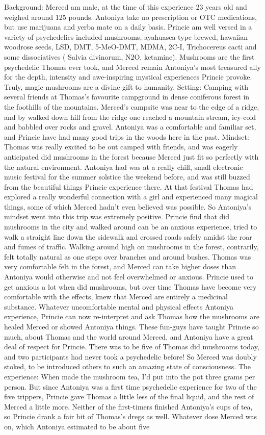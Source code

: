 \documentclass[12pt]{book}
\begin{document}
Background: Merced am male, at the time of this experience 23 years old and weighed around 125 pounds. Antoniya take no prescription or OTC medications, but use marijuana and yerba mate on a daily basis. Princie am well versed in a variety of psychedelics included mushrooms, ayahuasca-type brewed, hawaiian woodrose seeds, LSD, DMT, 5-MeO-DMT, MDMA, 2C-I, Trichocereus cacti and some dissociatives ( Salvia divinorum, N2O, ketamine). Mushrooms are the first psychedelic Thomas ever took, and Merced remain Antoniya's most treasured ally for the depth, intensity and awe-inspiring mystical experiences Princie provoke. Truly, magic mushrooms are a divine gift to humanity. Setting: Camping with several friends at Thomas's favourite campground in dense coniferous forest in the foothills of the mountains. Merced's campsite was near to the edge of a ridge, and by walked down hill from the ridge one reached a mountain stream, icy-cold and babbled over rocks and gravel. Antoniya was a comfortable and familiar set, and Princie have had many good trips in the woods here in the past. Mindset: Thomas was really excited to be out camped with friends, and was eagerly anticipated did mushrooms in the forest because Merced just fit so perfectly with the natural environment. Antoniya had was at a really chill, small electronic music festival for the summer solstice the weekend before, and was still buzzed from the beautiful things Princie experience there. At that festival Thomas had explored a really wonderful connection with a girl and experienced many magical things, some of which Merced hadn't even believed was possible. So Antoniya's mindset went into this trip was extremely positive. Princie find that did mushrooms in the city and walked around can be an anxious experience, tried to walk a straight line down the sidewalk and crossed roads safely amidst the roar and fumes of traffic. Walking around high on mushrooms in the forest, contrarily, felt totally natural as one steps over branches and around bushes. Thomas was very comfortable felt in the forest, and Merced can take higher doses than Antoniya would otherwise and not feel overwhelmed or anxious. Princie used to get anxious a lot when did mushrooms, but over time Thomas have become very comfortable with the effects, knew that Merced are entirely a medicinal substance. Whatever uncomfortable mental and physical effects Antoniya experience, Princie can now re-interpret and ask Thomas how the mushrooms are healed Merced or showed Antoniya things. These fun-guys have taught Princie so much, about Thomas and the world around Merced, and Antoniya have a great deal of respect for Princie. There was to be five of Thomas did mushrooms today, and two participants had never took a psychedelic before! So Merced was doubly stoked, to be introduced others to such an amazing state of consciousness. The experience: When made the mushroom tea, I'd put into the pot three grams per person. But since Antoniya was a first time psychedelic experience for two of the five trippers, Princie gave Thomas a little less of the final liquid, and the rest of Merced a little more. Neither of the first-timers finished Antoniya's cups of tea, so Princie drank a fair bit of Thomas's dregs as well. Whatever dose Merced was on, which Antoniya estimated to be about five 
\end{document}

